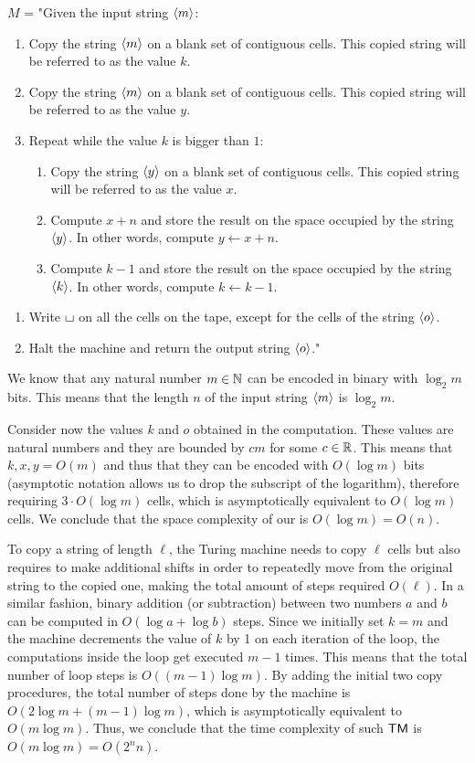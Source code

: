 \noindent
$M$ = "Given the input string $\left\langle m\right\rangle$:
\begin{enumerate}
    \item Copy the string $\left\langle m\right\rangle$ on a blank set of contiguous cells. This copied string will be referred to as the value $k$.
    \item Copy the string $\left\langle m\right\rangle$ on a blank set of contiguous cells. This copied string will be referred to as the value $y$.
    \item Repeat while the value $k$ is bigger than $1$:
    \begin{enumerate}[label={\arabic*.}, start=3]
        \item Copy the string $\left\langle y\right\rangle$ on a blank set of contiguous cells. This copied string will be referred to as the value $x$.
        \item Compute $x + n$ and store the result on the space occupied by the string $\left\langle y\right\rangle$. In other words, compute $y \gets x + n$.
        \item Compute $k - 1$ and store the result on the space occupied by the string $\left\langle k\right\rangle$. In other words, compute $k \gets k - 1$.
    \end{enumerate}
\end{enumerate}
\begin{enumerate}[label={\arabic*.}, start=6]
    \item Write $\blankchar$ on all the cells on the tape, except for the cells of the string $\left\langle o\right\rangle$.
    \item Halt the machine and return the output string $\left\langle o\right\rangle$."
\end{enumerate}

We know that any natural number $m \in \mathbb{N}$ can be encoded in binary with $\log_2 m$ bits. This means that the length $n$ of the input string $\left\langle m\right\rangle$ is $\log_2 m$.

Consider now the values $k$ and $o$ obtained in the computation. These values are natural numbers and they are bounded by $cm$ for some $c \in \mathbb{R}$. This means that $k, x, y = O(m)$ and thus that they can be encoded with $O(\log m)$ bits (asymptotic notation allows us to drop the subscript of the logarithm), therefore requiring $3 \cdot O(\log m)$ cells, which is asymptotically equivalent to $O(\log m)$ cells. We conclude that the space complexity of our \TM is $O(\log m) = O(n)$.

To copy a string of length $\ell$, the Turing machine needs to copy $\ell$ cells but also requires to make additional shifts in order to repeatedly move from the original string to the copied one, making the total amount of steps required $O(\ell)$. In a similar fashion, binary addition (or subtraction) between two numbers $a$ and $b$ can be computed in $O(\log a + \log b)$ steps. Since we initially set $k = m$ and the machine decrements the value of $k$ by 1 on each iteration of the loop, the computations inside the loop get executed $m-1$ times. This means that the total number of loop steps is $O((m-1) \log m)$. By adding the initial two copy procedures, the total number of steps done by the machine is $O(2 \log m + (m-1) \log m)$, which is asymptotically equivalent to $O(m \log m)$. Thus, we conclude that the time complexity of such $\textsf{TM}$ is $O(m \log m) = O(2^n n)$.


